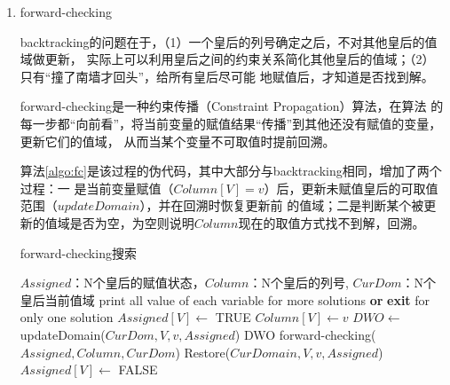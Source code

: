 \documentclass[10pt,letterpaper]{ctexart}
\begin{document}
\begin{enumerate}[itemindent=2em,label=\arabic*、]
  \newpage
  \item forward-checking
  \par \qquad backtracking的问题在于，（1）一个皇后的列号确定之后，不对其他皇后的值域做更新，
  实际上可以利用皇后之间的约束关系简化其他皇后的值域；（2）只有“撞了南墙才回头”，给所有皇后尽可能
  地赋值后，才知道是否找到解。
  \par \qquad forward-checking是一种约束传播（Constraint Propagation）算法，在算法
  的每一步都“向前看”，将当前变量的赋值结果“传播”到其他还没有赋值的变量，更新它们的值域，
  从而当某个变量不可取值时提前回溯。
  \par \qquad 算法\ref{algo:fc}是该过程的伪代码，其中大部分与backtracking相同，增加了两个过程：一
  是当前变量赋值（$Column[V]=v$）后，更新未赋值皇后的可取值范围（$updateDomain$），并在{\color{red}回溯时恢复更新前
  的值域}；二是判断某个被更新的值域是否为空，为空则说明$Column$现在的取值方式找不到解，回溯。

  \begin{algorithm}
    \caption{forward-checking搜索}
    \label{algo:fc}
      \begin{algorithmic}[1] %
        \Require $Assigned$：N个皇后的赋值状态，$Column$：N个皇后的列号, $CurDom$：N个皇后当前值域
              \State print all value of each variable
              \State \Return for more solutions \textbf{or} 
              \textbf{exit} for only one solution
            \Else
              \State $Assigned[V] \gets$ TRUE
                \State $Column[V] \gets v$
                \State $DWO \gets$ updateDomain($CurDom, V, v, Assigned$)
                  \State \Return DWO
                \Else
                  \State forward-checking($Assigned, Column, CurDom$)
                \EndIf
                \State Restore($CurDomain, V, v, Assigned$)
              \EndFor
              \State $Assigned[V] \gets$ FALSE
              
            \EndIf
          \EndFunction
      \end{algorithmic}
  \end{algorithm}

\end{enumerate}
\end{document}

